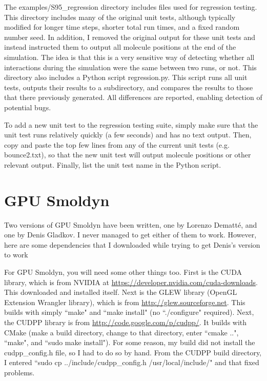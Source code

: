 \documentclass {book}
\begin{document}
The examples/S95\_regression directory includes files used for regression testing. This directory includes many of the original unit tests, although typically modified for longer time steps, shorter total run times, and a fixed random number seed. In addition, I removed the original output for these unit tests and instead instructed them to output all molecule positions at the end of the simulation. The idea is that this is a very sensitive way of detecting whether all interactions during the simulation were the same between two runs, or not. This directory also includes a Python script regression.py. This script runs all unit tests, outputs their results to a subdirectory, and compares the results to those that there previously generated. All differences are reported, enabling detection of potential bugs.

To add a new unit test to the regression testing suite, simply make sure that the unit test runs relatively quickly (a few seconds) and has no text output. Then, copy and paste the top few lines from any of the current unit tests (e.g. bounce2.txt), so that the new unit test will output molecule positions or other relevant output. Finally, list the unit test name in the Python script.

\section{GPU Smoldyn}

Two versions of GPU Smoldyn have been written, one by Lorenzo Dematt\'{e}, and one by Denis Gladkov. I never managed to get either of them to work. However, here are some dependencies that I downloaded while trying to get Denis's version to work

For GPU Smoldyn, you will need some other things too. First is the CUDA library, which is from NVIDIA at \url{https://developer.nvidia.com/cuda-downloads}. This downloaded and installed itself. Next is the GLEW library (OpenGL Extension Wrangler library), which is from \url{http://glew.sourceforge.net}. This builds with simply ``make" and ``make install" (no ``./configure" required). Next, the CUDPP library is from \url{http://code.google.com/p/cudpp/}. It builds with CMake (make a build directory, change to that directory, enter ``cmake ..", ``make", and ``sudo make install"). For some reason, my build did not install the cudpp\_config.h file, so I had to do so by hand. From the CUDPP build directory, I entered ``sudo cp ../include/cudpp\_config.h /usr/local/include/" and that fixed problems.
\end{document}
